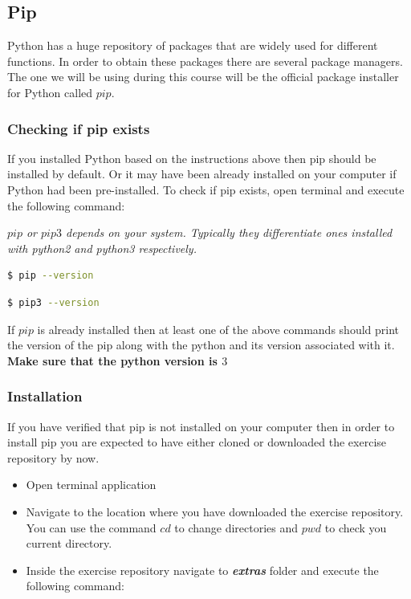 \documentclass{cmc}
\begin{document}
\subsection{Pip}
\label{sec-mac:pip}

Python has a huge repository of packages that are widely used for
different functions. In order to obtain these packages there are
several package managers. The one we will be using during this course
will be the official package installer for Python called $pip$.

\subsubsection{Checking if pip exists}
\label{sec-mac:checking-if-pip}

If you installed Python based on the instructions above then pip
should be installed by default. Or it may have been already installed
on your computer if Python had been pre-installed. To check if pip
exists, open terminal and execute the following command:

\textbf{}\textit{$pip$ or $pip3$ depends on your
  system. Typically they differentiate ones installed with python2 and
  python3 respectively.}

\begin{lstlisting}[language=bash]
$ pip --version
\end{lstlisting}

\begin{lstlisting}[language=bash]
$ pip3 --version
\end{lstlisting}

If
$pip$ is already installed then at least one of the above commands
should print the version of the pip along with the python and its
version associated with it. \textbf{Make sure that the python version
  is $3$}

\subsubsection{Installation}
\label{sec-mac:installation-pip}
If you have verified that pip is not installed on your computer then
in order to install pip you are expected to have either cloned or
downloaded the exercise repository by now.
\begin{itemize}
\item Open terminal application
\item Navigate to the location where you have downloaded the exercise
  repository. You can use the command $cd$ to change directories and
  $pwd$ to check you current directory.
\item Inside the exercise repository navigate to
  \textbf{\textit{extras}} folder and execute the following command:
\end{itemize}
\end{document}
